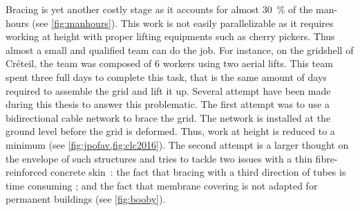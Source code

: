 Bracing is yet another costly stage as it accounts for almost 30~\% of the man-hours (see \cref{fig:manhours}). This work is not easily parallelizable as it requires working at height with proper lifting equipments such as cherry pickers. Thus almost a small and qualified team can do the job. For instance, on the gridshell of Créteil, the team was composed of 6 workers using two aerial lifts. This team spent three full days to complete this task, that is the same amount of days required to assemble the grid and lift it up. Several attempt have been made during this thesis to answer this problematic. The first attempt was to use a bidirectional cable network to brace the grid. The network is installed at the ground level before the grid is deformed. Thus, work at height is reduced to a minimum (see \cref{fig:jpofav,fig:clc2016}). The second attempt is a larger thought on the envelope of such structures and tries to tackle two issues with a thin fibre-reinforced concrete skin~: the fact that bracing with a third direction of tubes is time consuming ; and the fact that membrane covering is not adapted for permanent buildings \cite{Cuvilliers2017} (see \cref{fig:booby}).


